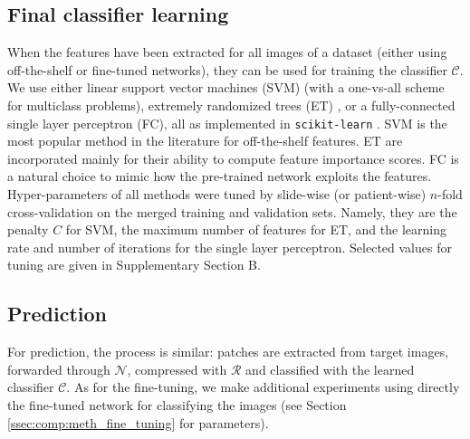 \subsection{Final classifier learning}
When the features have been extracted for all images of a dataset (either using off-the-shelf or fine-tuned networks), they can be used for training the classifier $\mathcal{C}$. 
We use either linear support vector machines (SVM) \parencite{fan2008liblinear} (with a one-vs-all scheme for multiclass problems), extremely randomized trees (ET) \parencite{geurts2006extremely}, or a fully-connected single layer perceptron (FC), all as implemented in \texttt{scikit-learn} \parencite{scikit-learn}. SVM is the most popular method in the literature for off-the-shelf features. ET are incorporated mainly for their ability to compute feature importance scores. FC is a natural choice to mimic how the pre-trained network exploits the features. Hyper-parameters of all methods were tuned by slide-wise (or patient-wise) $n$-fold cross-validation on the merged training and validation sets. Namely, they are the penalty $C$ for SVM, the maximum number of features for ET, and the learning rate and number of iterations for the single layer perceptron. Selected values for tuning are given in Supplementary Section B.


\subsection{Prediction}
For prediction, the process is similar: patches are extracted from target images, forwarded through $\mathcal{N}$, compressed with $\mathcal{R}$ and classified with the learned classifier $\mathcal{C}$. 
As for the fine-tuning, we make additional experiments using directly the fine-tuned network for classifying the images (see Section \ref{ssec:comp:meth_fine_tuning} for parameters).







